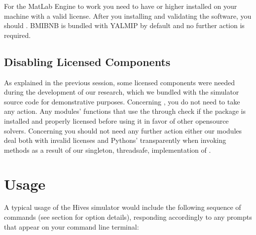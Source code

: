 \documentclass[letterpaper,10pt,english]{sphinxmanual}
\begin{document}
For the MatLab Engine to work you need to have
or higher installed on your machine with a valid license. After you installing
and validating the software, you should
. BMIBNB
is bundled with YALMIP by default and no further action is required.


\subsection{Disabling Licensed Components}
\label{\detokenize{quickstartdocs:disabling-licensed-components}}
As explained in the previous session, some licensed components were needed
during the development of our research, which we bundled with the simulator
source code for demonstrative purposes. Concerning , you do not need to
take any action. Any modules’ functions that use the
through  check if the package is installed and properly licensed before
using it in favor of other open\sphinxhyphen{}source solvers. Concerning  you should
not need any further action either \sphinxhyphen{} our modules deal both with invalid
licenses and Pythons’
transparently when invoking  methods as a result of our singleton,
thread\sphinxhyphen{}safe, implementation of {\hyperref[\detokenize{app.domain.helpers:app.domain.helpers.matlab_utils.MatlabEngineContainer}]{}}.


\section{Usage}
\label{\detokenize{quickstartdocs:usage}}
A typical usage of the Hives simulator would include the following sequence of
commands (see {\hyperref[\detokenize{scriptdocs:id1}]{}} section for option details), responding
accordingly to any prompts that appear on your command line terminal:
\begin{quote}



\end{quote}
\end{document}
